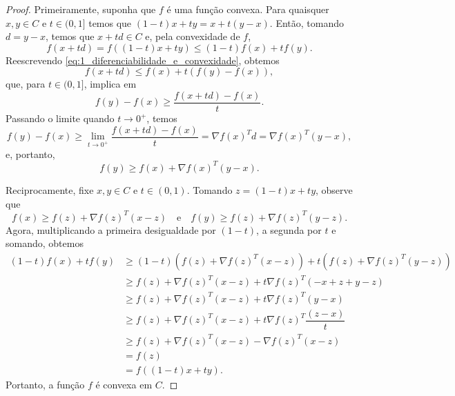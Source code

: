 \documentclass[12pt,a4paper]{scrartcl}
\theoremstyle{definition}%
\begin{document}
\begin{proof}
Primeiramente, suponha que $f$ é uma função convexa. Para quaisquer $x,y \in C$ e $t \in (0,1]$ temos que $(1-t)x + ty = x + t(y-x)$. Então, tomando $d = y-x$, temos que $x + td \in C$ e, pela convexidade de $f$,
\[ \label{eq:1_diferenciabilidade_e_convexidade}
f(x+td) = f((1-t)x + ty) \leq (1-t)f(x) + tf(y).
\]
Reescrevendo \eqref{eq:1_diferenciabilidade_e_convexidade}, obtemos
\[
f(x+td) \leq f(x) + t(f(y)-f(x)),
\]
que, para $t\in (0,1]$, implica em 
\[
f(y)-f(x) \geq \dfrac{f(x+td)-f(x)}{t} .
\]
Passando o limite quando $t \rightarrow 0^{+}$, temos
\[
f(y)-f(x) \geq \displaystyle\lim_{t \rightarrow 0^{+}} \dfrac{f(x+td)-f(x)}{t} = \nabla f(x)^{T} d = \nabla f(x)^{T} (y-x) ,
\]
e, portanto,
\[
f(y) \geq f(x) + \nabla f(x)^{T} (y-x) .
\]

Reciprocamente, fixe $x, y \in C$ e $t \in (0,1)$. Tomando $z = (1-t)x + ty$, observe que 
\[
f(x) \geq f(z) + \nabla f(z)^{T}(x-z) \quad \text{e} \quad f(y) \geq f(z) + \nabla f(z)^{T}(y-z) .
\]
Agora, multiplicando a primeira desigualdade por $(1-t)$, a segunda por $t$ e somando, obtemos
\begin{align}
(1-t)f(x) + tf(y) & \geq (1-t)(f(z) + \nabla f(z)^{T}(x-z)) + t(f(z) + \nabla f(z)^{T}(y-z)) \\
& \geq f(z) + \nabla f(z)^{T}(x-z) + t\nabla f(z)^{T}(-x+z+y-z) \\
& \geq f(z) + \nabla f(z)^{T}(x-z) + t\nabla f(z)^{T}(y-x) \\
& \geq f(z) + \nabla f(z)^{T}(x-z) + t\nabla f(z)^{T} \dfrac{(z-x)}{t} \\
& \geq f(z) + \nabla f(z)^{T}(x-z) - \nabla f(z)^{T}(x-z) \\
& = f(z) \\
& = f((1-t)x + ty) .
\end{align}
Portanto, a função $f$ é convexa em $C$.
\end{proof}
\end{document}
